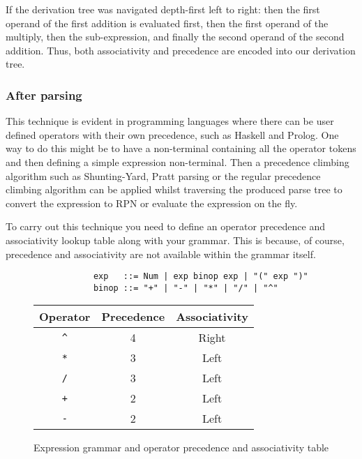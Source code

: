 \documentclass[12pt, letterpaper]{article}
\theoremstyle{definition}
\begin{document}
If the derivation tree was navigated depth-first left to right: then the first operand of the first addition is evaluated first, then the first operand of the multiply, then the sub-expression, and finally the second operand of the second addition. Thus, both associativity and precedence are encoded into our derivation tree.\textsuperscript{\cite{lam_2019}}

\subsubsection{After parsing}

This technique is evident in programming languages where there can be user defined operators with their own precedence, such as Haskell and Prolog. One way to do this might be to have a non-terminal containing all the operator tokens and then defining a simple expression non-terminal. Then a precedence climbing algorithm such as Shunting-Yard, Pratt parsing or the regular precedence climbing algorithm\textsuperscript{\cite{operator-precedence-parser-wikipedia}} can be applied whilst traversing the produced parse tree to convert the expression to RPN or evaluate the expression on the fly.

To carry out this technique you need to define an operator precedence and associativity lookup table along with your grammar. This is because, of course, precedence and associativity are not available within the grammar itself.

\begin{figure}[H]
    \begin{center}
        \begin{verbatim}
            exp   ::= Num | exp binop exp | "(" exp ")"
            binop ::= "+" | "-" | "*" | "/" | "^"
        \end{verbatim}
        \vspace{1em}
        \begin{tabular}{| c | c | c |}
            \hline
            Operator & Precedence & Associativity\\
            \hline
            \verb|^| & 4 & Right\\
            \hline
            \verb|*| & 3 & Left\\
            \hline
            \verb|/| & 3 & Left\\
            \hline
            \verb|+| & 2 & Left\\
            \hline
            \verb|-| & 2 & Left\\
            \hline
        \end{tabular}
    \end{center}
    \vspace{-1em}
    \caption{\label{fig:4.6}Expression grammar and operator precedence and associativity table}
\end{figure}
\end{document}

